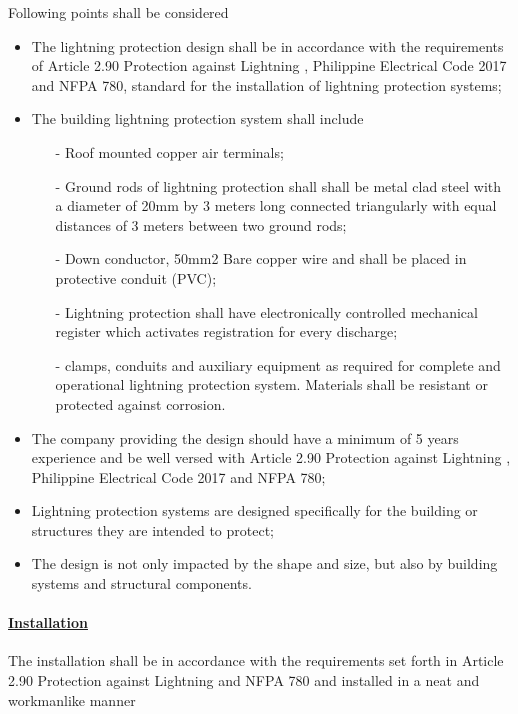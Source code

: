 Following points shall be considered
\begin{itemize}
\item The lightning protection design shall be in accordance with the requirements of Article 2.90 Protection against Lightning , Philippine Electrical Code 2017 and NFPA 780, standard for the installation of lightning protection systems;

\item The building lightning protection system shall include 

\begin{itemize}
\item[-] Roof mounted copper air terminals; 
\item[-]	Ground rods of lightning protection shall shall be metal clad steel with a diameter of 20mm by 3 meters long connected triangularly with equal distances of 3 meters between two ground rods;
\item[-]	Down conductor, 50mm2 Bare copper wire and shall be placed in protective conduit (PVC);
\item[-]	Lightning protection shall have electronically controlled mechanical register which activates registration for every discharge; 
\item[-]	clamps, conduits and auxiliary equipment as required for complete and operational lightning protection system. Materials shall be resistant or protected against  corrosion. 

\end{itemize}

\item The company providing the design should have a minimum of 5 years experience and be well versed with Article 2.90 Protection against Lightning , Philippine Electrical Code 2017 and NFPA 780;
\item 	Lightning protection systems are designed specifically for the building or structures they are intended to protect;
\item 	The design is not only impacted by the shape and size, but also by building systems and structural components.

\end{itemize}

\paragraph{\underline{Installation}}
The installation shall be in accordance with the requirements set forth in Article 2.90 Protection against Lightning and NFPA 780 and installed in a neat and workmanlike manner


